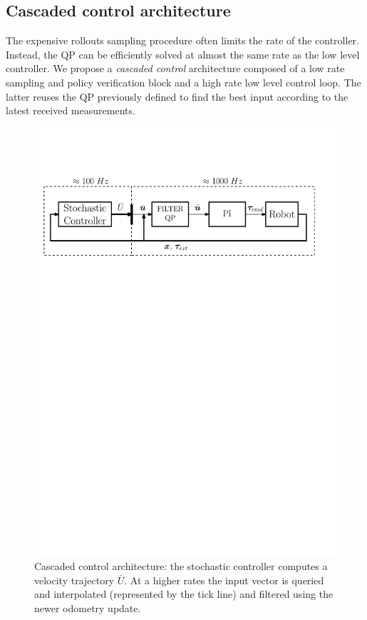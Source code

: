 \subsection{Cascaded control architecture}
The expensive rollouts sampling procedure often limits the rate of the controller. Instead, the QP can be efficiently solved at almost the same rate as the low level controller. We propose a \emph{cascaded control} architecture composed of a low rate sampling and policy verification block and a high rate low level control loop. The latter reuses the QP previously defined to find the best input according to the latest received measurements. 
\begin{figure}[t!]
\centering
\hspace*{-0.7cm}
\includegraphics[width=1.1\columnwidth]{figures/schemes/high_level_architecture.pdf}
\caption{Cascaded control architecture: the stochastic controller computes a velocity trajectory $\bar{U}$. At a higher rates the input vector is queried and interpolated (represented by the tick line) and filtered using the newer odometry update.} \label{fig:cascaded_architecture}
\end{figure}

